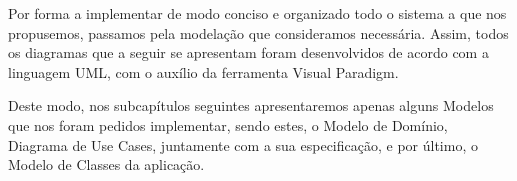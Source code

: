 Por forma a implementar de modo conciso e organizado todo o sistema a que nos propusemos, passamos pela modelação que consideramos necessária. Assim, todos os diagramas que a seguir se apresentam foram desenvolvidos de acordo com a linguagem UML, com o auxílio da ferramenta Visual Paradigm.
\par Deste modo, nos subcapítulos seguintes apresentaremos apenas alguns Modelos que nos foram pedidos implementar, sendo estes, o Modelo de Domínio, Diagrama de Use Cases, juntamente com a sua especificação, e por último, o Modelo de Classes da aplicação. 